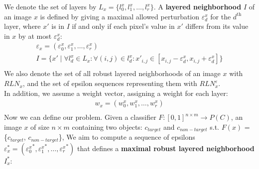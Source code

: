 We denote the set of layers by $L_x = \{l_0^x, l_1^x, \ldots, l_r^x\}$.
A \textbf{layered neighborhood} $I$ of an image $x$ is defined by giving a maximal allowed perturbation $\varepsilon_d^x$ for the $d^\text{th}$ layer, where $x'$ is in $I$ if and only if each pixel's value in $x'$ differs from its value in $x$ by at most $\varepsilon_d^x$:\\
\begin{gather*}
    \varepsilon_x = (\varepsilon_0^x, \varepsilon_1^x, \ldots, \varepsilon_r^x)\\
    I = \{x' \mid \forall l_d^x\in L_x: \forall (i,j)\in l_d^x: x'_{i,j} \in [x_{i,j}-\varepsilon_d^x, x_{i,j}+\varepsilon_d^x]\}\\
\end{gather*}
We also denote the set of all robust layered neighborhoods of an image $x$ with $RLN_x$, and the set of epsilon sequences representing them with $RLN_x^\varepsilon$.\\
In addition, we assume a weight vector, assigning a weight for each layer:
\begin{gather*}
    w_x = (w_0^x, w_1^x, \ldots, w_r^x)\\
\end{gather*}
Now we can define our problem.
Given a classifier $F:[0, 1]^{n \times m} \rightarrow P(C)$, an image $x$ of size $n\times m$ containing two objects: $c_{target}$ and $c_{non-target}$ \textrm{s.t.} $F(x)$ = \{$c_{target}$, $c_{non-target}$\},
We aim to compute a sequence of epsilons $\varepsilon_x^* = ({\varepsilon_0^x}^*, {\varepsilon_1^x}^*, \ldots, {\varepsilon_r^x}^*)$ that defines a \textbf{maximal robust layered neighborhood} $I_x^*$:
